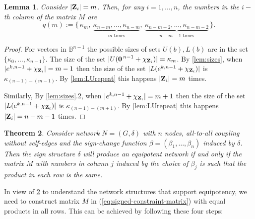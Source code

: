 \documentclass[12pt]{amsart}
\newcommand{\bZ}{{\bf Z}}
\newcommand{\bbB}{\mathbb{B}}
\newtheorem{thm}{Theorem}[section]
\newtheorem{lem}[thm]{Lemma}
\theoremstyle{definition}
\begin{document}
\begin{lem}\label{lem:qm}
    Consider $|\bZ_i|=m$. Then, for any $i=1, \ldots, n$, the numbers in the $i-$th column of the matrix $M$ are 
    \[
    q(m):= \{\,\kappa_m,\ \underbrace{\kappa_{n-m},\dots,\kappa_{n-m}}_{m\text{ times}},\ 
    \underbrace{\kappa_{n-m-2},\dots,\kappa_{n-m-2}}_{n-m-1\text{ times}}\,\}.
    \]
\end{lem}
\begin{proof}
    For vectors in $\bbB^{n-1}$ the possible sizes of sets $U(b), L(b)$ are in the set $\{ \kappa_0, \ldots, \kappa_{n-1}\}$. 
    The size of the set $|U(\boldsymbol{0}^{\,n-1}+\chi_{\bZ_i})|= \kappa_m$.
    By \cref{lem:sizes}, when $|e^{k,n-1}+\chi_{\bZ_i}|=m-1$ then the size of the set $|L(e^{k,n-1}+\chi_{\bZ_i})|$ is $\kappa_{(n-1)-(m-1)}$. By \cref{lem:LUrepeat} this happens $|\bZ_i|=m$ times. 

    Similarly, By \cref{lem:sizes}.2, when $|e^{k,n-1}+\chi_{\bZ_i}|=m+1$ then the size of the set $|L(e^{k,n-1}+\chi_{\bZ_i})|$ is $\kappa_{(n-1)-(m+1)}$. By \cref{lem:LUrepeat} this happens $|\bZ_i|=n-m-1$ times. 
\end{proof}

\begin{thm}\label{thm:final_equipotency}
Consider network $N=(G,\delta)$ with $n$ nodes, all-to-all coupling without self-edges and the sign-change function $\beta=(\beta_1, \ldots, \beta_n)$ induced by $\delta$.
Then the sign structure $\delta $ will produce an equipotent network if and only if the matrix $M$ with numbers in column $j$ induced by the choice of $\beta_j$ is such that the product in each row is the same.
\end{thm}

In view of \cref{thm:final_equipotency} to understand the network structures that support equipotency, we need to construct matrix $M$ in (\ref{eq:signed-constraint-matrix}) with equal products in all rows. This can be achieved by following these four steps:
\end{document}
